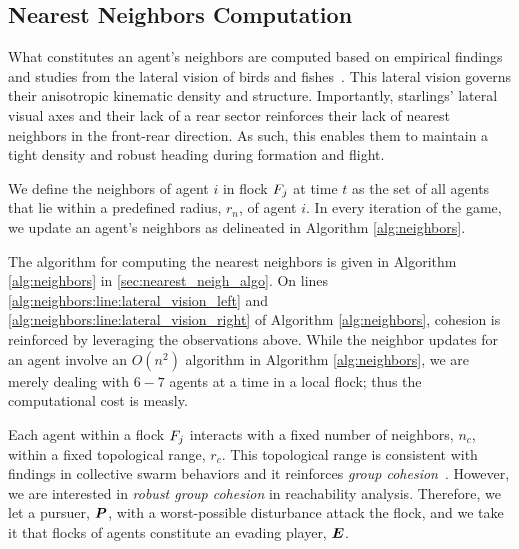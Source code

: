 \subsection{Nearest Neighbors Computation}
%
What constitutes an agent's neighbors are computed based on empirical findings and studies from the lateral vision of birds and fishes~\cite{Ballerini1232, JadbabaieCoord, Helbing20}. This lateral vision governs their anisotropic kinematic density and structure. Importantly, starlings' lateral visual axes and their lack of a rear sector reinforces their lack of nearest neighbors in the front-rear direction. As such, this enables them to maintain a tight density and robust heading during formation and flight.

\begin{definition}
	We define the neighbors of agent $i$ in flock $F_j$ at time $t$ as the set of all agents that lie within a predefined radius, $r_n$, of agent $i$. In every iteration of the game, we update an agent's neighbors as delineated in Algorithm \ref{alg:neighbors}.
\end{definition}
%

The algorithm for computing the nearest neighbors is given in Algorithm \autoref{alg:neighbors} in \autoref{sec:nearest_neigh_algo}. On lines \autoref{alg:neighbors:line:lateral_vision_left} and \autoref{alg:neighbors:line:lateral_vision_right} of Algorithm \autoref{alg:neighbors}, cohesion is reinforced by leveraging the observations above. While the neighbor updates for an agent involve an $O(n^2)$ algorithm in Algorithm \ref{alg:neighbors}, we are merely dealing with $6-7$ agents at a time in a local flock; thus the computational cost is measly.

Each agent within a flock $F_j$ interacts with a fixed number of neighbors, $n_c$, within a fixed topological range, $r_c$. This topological range %
is consistent with findings in collective swarm behaviors and it reinforces \textit{group cohesion}~\cite{Ballerini1232}. However, we are interested in \textit{robust group cohesion} in reachability analysis. Therefore, we let a pursuer, $\bm{P}$, with a worst-possible disturbance attack the flock, and we take it that flocks of agents constitute an evading player, $\bm{E}$. 

